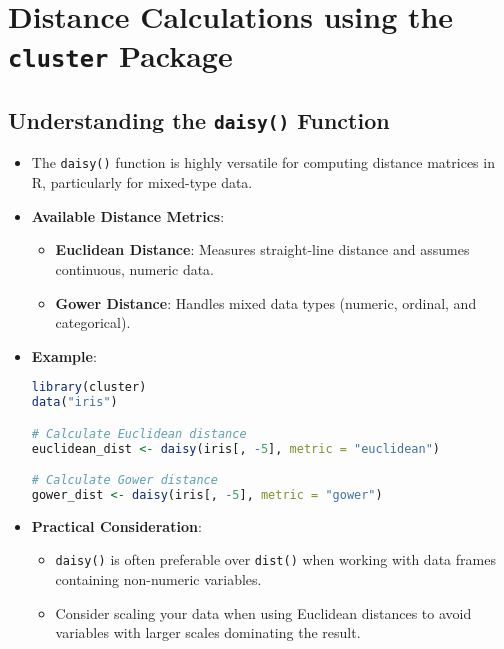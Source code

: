 \section{Distance Calculations using the \texttt{cluster} Package}
\subsection{Understanding the \texttt{daisy()} Function}
\begin{itemize}
    \item The \texttt{daisy()} function is highly versatile for computing distance matrices in R, particularly for mixed-type data.
    \item \textbf{Available Distance Metrics}:
    \begin{itemize}
        \item \textbf{Euclidean Distance}: Measures straight-line distance and assumes continuous, numeric data.
        \item \textbf{Gower Distance}: Handles mixed data types (numeric, ordinal, and categorical).
    \end{itemize}
    \item \textbf{Example}:
\begin{lstlisting}[language=R]
library(cluster)
data("iris")

# Calculate Euclidean distance
euclidean_dist <- daisy(iris[, -5], metric = "euclidean")

# Calculate Gower distance
gower_dist <- daisy(iris[, -5], metric = "gower")
\end{lstlisting}
\item \textbf{Practical Consideration}:
    \begin{itemize}
        \item \texttt{daisy()} is often preferable over \texttt{dist()} when working with data frames containing non-numeric variables.
        \item Consider scaling your data when using Euclidean distances to avoid variables with larger scales dominating the result.
    \end{itemize}
\end{itemize}

